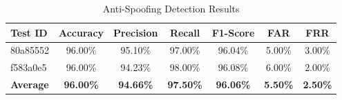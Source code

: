 \begin{table}[htbp]
\centering
\caption{Anti-Spoofing Detection Results}
\label{tab:antispoofing_results}
\begin{tabular}{|l|c|c|c|c|c|c|}
\hline
\textbf{Test ID} & \textbf{Accuracy} & \textbf{Precision} & \textbf{Recall} & \textbf{F1-Score} & \textbf{FAR} & \textbf{FRR} \\
\hline
80a85552 & 96.00\% & 95.10\% & 97.00\% & 96.04\% & 5.00\% & 3.00\% \\
\hline
f583a0e5 & 96.00\% & 94.23\% & 98.00\% & 96.08\% & 6.00\% & 2.00\% \\
\hline
\hline
\textbf{Average} & \textbf{96.00\%} & \textbf{94.66\%} & \textbf{97.50\%} & \textbf{96.06\%} & \textbf{5.50\%} & \textbf{2.50\%} \\
\hline
\end{tabular}
\end{table}